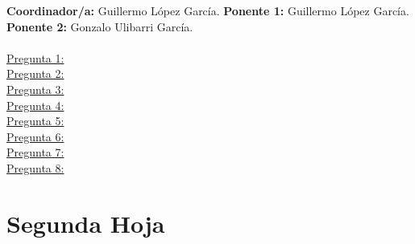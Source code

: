 \documentclass[]{article}
\begin{document}
\textbf{Coordinador/a: } Guillermo López García. \newline
\textbf{Ponente 1: } Guillermo López García. \newline
\textbf{Ponente 2: } Gonzalo Ulibarri García.
\\
\\
\underline{Pregunta 1:} \\
\underline{Pregunta 2:} \\
\underline{Pregunta 3:} \\
\underline{Pregunta 4:} \\
\underline{Pregunta 5:} \\
\underline{Pregunta 6:} \\
\underline{Pregunta 7:} \\
\underline{Pregunta 8:} \\

\newpage

\section{Segunda Hoja}
\begin{table}[h!]
  \centering
  \begin{center}
    \caption{Tabla profesor}
  \end{center}
\end{table}

\newpage
\end{document}
